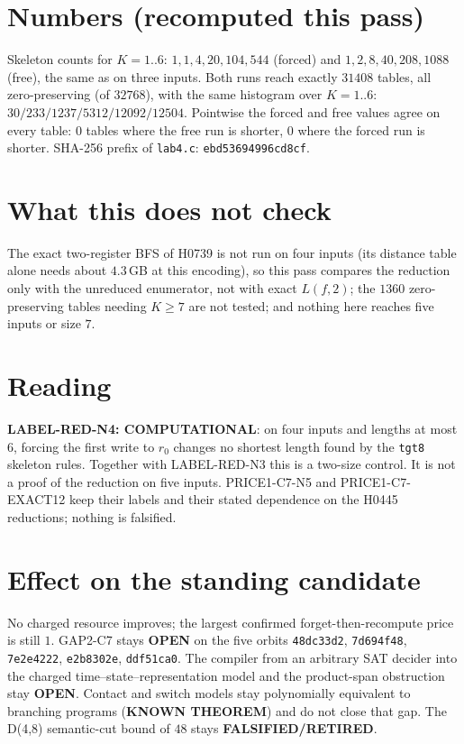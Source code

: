 \documentclass[11pt]{article}
\begin{document}
\section*{Numbers (recomputed this pass)}
Skeleton counts for $K=1..6$: $1,1,4,20,104,544$ (forced) and $1,2,8,40,208,1088$ (free), the same as on three inputs. Both runs reach exactly $31408$ tables, all zero-preserving (of $32768$), with the same histogram over $K=1..6$: $30/233/1237/5312/12092/12504$. Pointwise the forced and free values agree on every table: $0$ tables where the free run is shorter, $0$ where the forced run is shorter. SHA-256 prefix of \texttt{lab4.c}: \texttt{ebd53694996cd8cf}.

\section*{What this does not check}
The exact two-register BFS of H0739 is not run on four inputs (its distance table alone needs about $4.3$\,GB at this encoding), so this pass compares the reduction only with the unreduced enumerator, not with exact $L(f,2)$; the $1360$ zero-preserving tables needing $K\ge7$ are not tested; and nothing here reaches five inputs or size $7$.

\section*{Reading}
\textbf{LABEL-RED-N4: COMPUTATIONAL}: on four inputs and lengths at most $6$, forcing the first write to $r_0$ changes no shortest length found by the \texttt{tgt8} skeleton rules. Together with LABEL-RED-N3 this is a two-size control. It is not a proof of the reduction on five inputs. PRICE1-C7-N5 and PRICE1-C7-EXACT12 keep their labels and their stated dependence on the H0445 reductions; nothing is falsified.

\section*{Effect on the standing candidate}
No charged resource improves; the largest confirmed forget-then-recompute price is still $1$. GAP2-C7 stays \textbf{OPEN} on the five orbits \texttt{48dc33d2}, \texttt{7d694f48}, \texttt{7e2e4222}, \texttt{e2b8302e}, \texttt{ddf51ca0}. The compiler from an arbitrary SAT decider into the charged time--state--representation model and the product-span obstruction stay \textbf{OPEN}. Contact and switch models stay polynomially equivalent to branching programs (\textbf{KNOWN THEOREM}) and do not close that gap. The D(4,8) semantic-cut bound of $48$ stays \textbf{FALSIFIED/RETIRED}.
\end{document}
